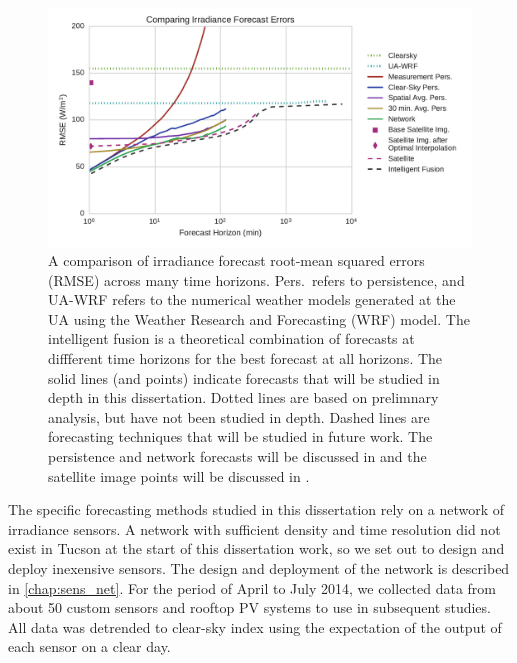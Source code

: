 \begin{figure}[htbp]
\includegraphics[width=\textwidth]{figs/timehorizon.pdf}
\caption[Irradiance forecast errors across forecast horizons]{A
  comparison of irradiance forecast root-mean squared errors (RMSE)
  across many time horizons.  Pers.\ refers to persistence, and UA-WRF
  refers to the numerical weather models generated at the UA using the
  Weather Research and Forecasting (WRF) model. The intelligent fusion
  is a theoretical combination of forecasts at diffferent time
  horizons for the best forecast at all horizons.  The solid lines
  (and points) indicate forecasts that will be studied in depth in
  this dissertation. Dotted lines are based on prelimnary analysis,
  but have not been studied in depth.  Dashed lines are forecasting
  techniques that will be studied in future work.  The persistence and
  network forecasts will be discussed in  and the
  satellite image points will be discussed in .}
\label{fig:newshitplot}
\end{figure}

The specific forecasting methods studied in this dissertation rely on
a network of irradiance sensors.
A network with sufficient density and time resolution did not exist in
Tucson at the start of this dissertation work, so we set out to design
and deploy inexensive sensors.
The design and deployment of the network is described in
\cref{chap:sens_net}.
For the period of April to July 2014, we collected data from about 50
custom sensors and rooftop PV systems to use in subsequent studies.
All data was detrended to clear-sky index using the expectation of the
output of each sensor on a clear day.

